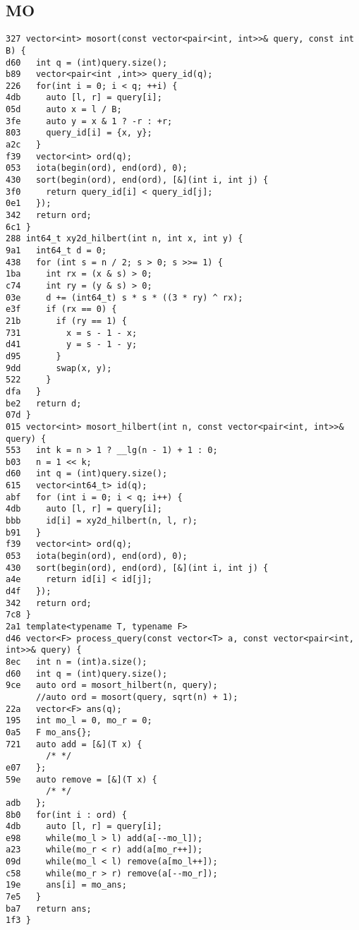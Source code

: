 \documentclass[10pt, a4paper, twoside]{article}
\begin{document}
\subsection{MO}
\begin{lstlisting}
327 vector<int> mosort(const vector<pair<int, int>>& query, const int B) {
d60   int q = (int)query.size();
b89   vector<pair<int ,int>> query_id(q);
226   for(int i = 0; i < q; ++i) {
4db     auto [l, r] = query[i];
05d     auto x = l / B;
3fe     auto y = x & 1 ? -r : +r;
803     query_id[i] = {x, y};
a2c   }
f39   vector<int> ord(q);
053   iota(begin(ord), end(ord), 0);
430   sort(begin(ord), end(ord), [&](int i, int j) {
3f0     return query_id[i] < query_id[j];
0e1   });
342   return ord;
6c1 }
288 int64_t xy2d_hilbert(int n, int x, int y) {
9a1   int64_t d = 0;
438   for (int s = n / 2; s > 0; s >>= 1) {
1ba     int rx = (x & s) > 0;
c74     int ry = (y & s) > 0;
03e     d += (int64_t) s * s * ((3 * ry) ^ rx);
e3f     if (rx == 0) {
21b       if (ry == 1) {
731         x = s - 1 - x;
d41         y = s - 1 - y;
d95       }
9dd       swap(x, y);
522     }
dfa   }
be2   return d;
07d }
015 vector<int> mosort_hilbert(int n, const vector<pair<int, int>>& query) {
553   int k = n > 1 ? __lg(n - 1) + 1 : 0;
b03   n = 1 << k;
d60   int q = (int)query.size();
615   vector<int64_t> id(q);
abf   for (int i = 0; i < q; i++) {
4db     auto [l, r] = query[i];
bbb     id[i] = xy2d_hilbert(n, l, r);
b91   }
f39   vector<int> ord(q);
053   iota(begin(ord), end(ord), 0);
430   sort(begin(ord), end(ord), [&](int i, int j) { 
a4e     return id[i] < id[j];
d4f   });
342   return ord;
7c8 }
2a1 template<typename T, typename F>
d46 vector<F> process_query(const vector<T> a, const vector<pair<int, int>>& query) {
8ec   int n = (int)a.size();
d60   int q = (int)query.size();
9ce   auto ord = mosort_hilbert(n, query);
      //auto ord = mosort(query, sqrt(n) + 1);
22a   vector<F> ans(q);
195   int mo_l = 0, mo_r = 0;
0a5   F mo_ans{};
721   auto add = [&](T x) {
        /* */
e07   };
59e   auto remove = [&](T x) {
        /* */
adb   };
8b0   for(int i : ord) {
4db     auto [l, r] = query[i];
e98     while(mo_l > l) add(a[--mo_l]);
a23     while(mo_r < r) add(a[mo_r++]);
09d     while(mo_l < l) remove(a[mo_l++]);
c58     while(mo_r > r) remove(a[--mo_r]);
19e     ans[i] = mo_ans;
7e5   }
ba7   return ans;
1f3 }
\end{lstlisting}
\end{document}
